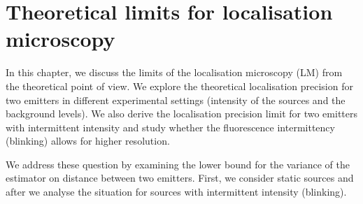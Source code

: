 \chapter{Theoretical limits for localisation microscopy \label{sec:Theoretical-limits-of teh LM}}

%
%
%
%
%
%
%
%
%
%

In this chapter, we discuss the limits of the localisation microscopy (LM) from the theoretical point of view. We explore the theoretical localisation precision for two emitters in different experimental settings (intensity of the sources and the background levels). We also derive the localisation precision limit for two emitters with intermittent intensity and study whether the fluorescence intermittency (blinking) allows for higher resolution.

We address these question by examining the \CR lower bound for the variance of the estimator on distance between two emitters. First, we consider static sources and after we analyse the situation for sources with intermittent intensity (blinking). 


